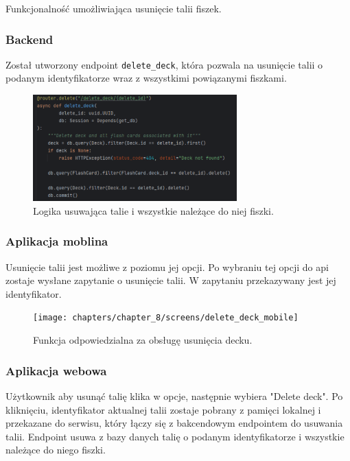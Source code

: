 Funkcjonalność umożliwiająca usunięcie talii fiszek.

\subsubsection{Backend}

Został utworzony endpoint \texttt{delete\_deck}, która pozwala na usunięcie talii o podanym identyfikatorze wraz z wszystkimi powiązanymi fiszkami.

\begin{figure}[H]
    \centering
    \includegraphics[width=0.7\textwidth]{chapters/chapter_8/screens/delete_deck_backend}
    \caption{Logika usuwająca talie i wszystkie należące do niej fiszki.}
    \label{img:delete_deck_backend}
\end{figure}


\subsubsection{Aplikacja moblina}
Usunięcie talii jest możliwe z poziomu jej opcji. Po wybraniu tej opcji do api zostaje wysłane zapytanie o usunięcie talii. W zapytaniu przekazywany jest jej identyfikator.

\begin{figure}[H]
    \centering
    \texttt{[image: chapters/chapter\_8/screens/delete\_deck\_mobile]}
    \caption{Funkcja odpowiedzialna za obsługę usunięcia decku.}
    \label{img:delete_deck_mobile}
\end{figure}

\subsubsection{Aplikacja webowa}

Użytkownik aby usunąć talię klika w opcje, następnie wybiera "Delete deck". Po kliknięciu, identyfikator aktualnej talii zostaje pobrany z pamięci lokalnej i przekazane do serwisu, który łączy się z bakcendowym endpointem do usuwania talii. Endpoint usuwa z bazy danych talię o podanym identyfikatorze i wszystkie należące do niego fiszki.

